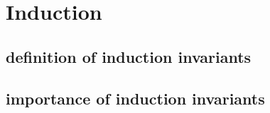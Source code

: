 \section{Induction}
\subsection{definition of induction invariants}
\subsection{importance of induction invariants}
